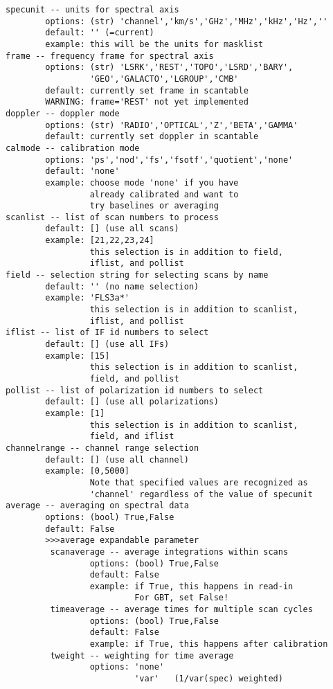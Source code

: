 \begin{verbatim}
specunit -- units for spectral axis
        options: (str) 'channel','km/s','GHz','MHz','kHz','Hz',''
        default: '' (=current)
        example: this will be the units for masklist
frame -- frequency frame for spectral axis
        options: (str) 'LSRK','REST','TOPO','LSRD','BARY',
                 'GEO','GALACTO','LGROUP','CMB'
        default: currently set frame in scantable
        WARNING: frame='REST' not yet implemented
doppler -- doppler mode
        options: (str) 'RADIO','OPTICAL','Z','BETA','GAMMA'
        default: currently set doppler in scantable
calmode -- calibration mode
        options: 'ps','nod','fs','fsotf','quotient','none'
        default: 'none'
        example: choose mode 'none' if you have
                 already calibrated and want to
                 try baselines or averaging
scanlist -- list of scan numbers to process
        default: [] (use all scans)
        example: [21,22,23,24]
                 this selection is in addition to field,
                 iflist, and pollist
field -- selection string for selecting scans by name
        default: '' (no name selection)
        example: 'FLS3a*'
                 this selection is in addition to scanlist,
                 iflist, and pollist
iflist -- list of IF id numbers to select
        default: [] (use all IFs)
        example: [15]
                 this selection is in addition to scanlist,
                 field, and pollist
pollist -- list of polarization id numbers to select
        default: [] (use all polarizations)
        example: [1]
                 this selection is in addition to scanlist,
                 field, and iflist
channelrange -- channel range selection
        default: [] (use all channel)
        example: [0,5000]
                 Note that specified values are recognized as 
                 'channel' regardless of the value of specunit 
average -- averaging on spectral data 
        options: (bool) True,False
        default: False
        >>>average expandable parameter
         scanaverage -- average integrations within scans
                 options: (bool) True,False
                 default: False
                 example: if True, this happens in read-in
                          For GBT, set False!
         timeaverage -- average times for multiple scan cycles
                 options: (bool) True,False
                 default: False
                 example: if True, this happens after calibration
         tweight -- weighting for time average
                 options: 'none'
                          'var'   (1/var(spec) weighted)

\end{verbatim}

